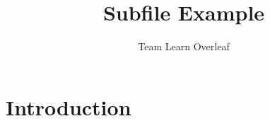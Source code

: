 \documentclass{article}
\title{Subfile Example}
\author{Team Learn Overleaf}
\date{ }
\begin{document}
\maketitle

\section{Introduction}


\end{document}
